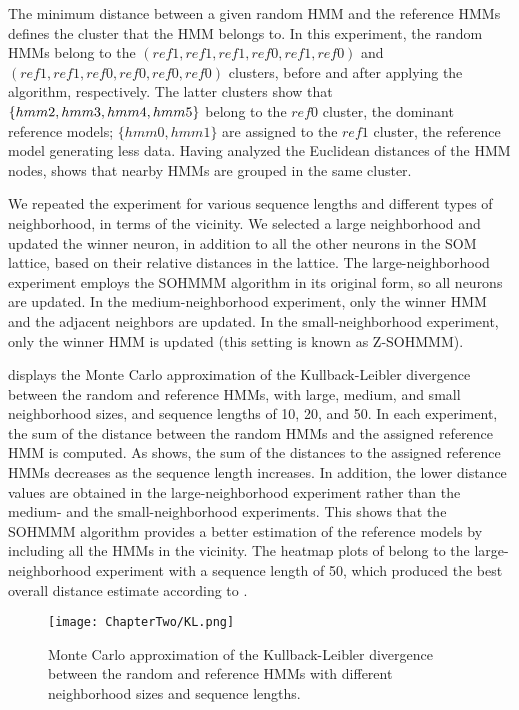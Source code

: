 The minimum distance between a given random HMM and the reference HMMs defines the cluster that the HMM belongs to. In this experiment, the random HMMs belong to the $(ref1,ref1,ref1,ref0,ref1,ref0)$ and $(ref1,ref1,ref0,ref0,ref0,ref0)$ clusters, before and after applying the algorithm, respectively. The latter clusters show that $\{hmm2,hmm3,hmm4\-,hmm5\}$ belong to the $ref0$ cluster, the dominant reference models; $\{hmm0,hmm1\}$ are assigned to the $ref1$ cluster, the reference model generating less data. Having analyzed the Euclidean distances of the HMM nodes,  shows that nearby HMMs are grouped in the same cluster.

We repeated the experiment for various sequence lengths and different types of neighborhood, in terms of the vicinity. We selected a large neighborhood and updated the winner neuron, in addition to all the other neurons in the SOM lattice, based on their relative distances in the lattice. The large-neighborhood experiment employs the SOHMMM algorithm in its original form, so all neurons are updated. In the medium-neighborhood experiment, only the winner HMM and the adjacent neighbors are updated. In the small-neighborhood experiment, only the winner HMM is updated (this setting is known as Z-SOHMMM).

 displays the Monte Carlo approximation of the Kullback-Leibler divergence between the random and reference HMMs, with large, medium, and small neighborhood sizes, and sequence lengths of 10, 20, and 50. In each experiment, the sum of the distance between the random HMMs and the assigned reference HMM is computed. As  shows, the sum of the distances to the assigned reference HMMs decreases as the sequence length increases. In addition, the lower distance values are obtained in the large-neighborhood experiment rather than the medium- and the small-neighborhood experiments. This shows that the SOHMMM algorithm provides a better estimation of the reference models by including all the HMMs in the vicinity. The heatmap plots of  belong to the large-neighborhood experiment with a sequence length of 50, which produced the best overall distance estimate according to .

\begin{figure}[h]
    \centering
    \texttt{[image: ChapterTwo/KL.png]}
    \caption{Monte Carlo approximation of the Kullback-Leibler divergence between the random and reference HMMs with different neighborhood sizes and sequence lengths.}
    \label{fig:sohmmm_dist_neig}
\end{figure}

